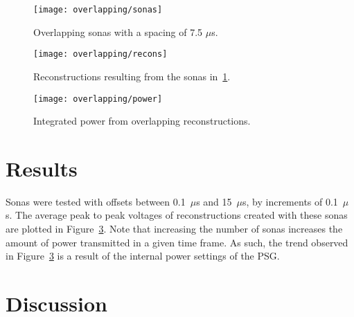 \begin{figure}[t]
\centering
\texttt{[image: overlapping/sonas]}
\caption[Overlapping sonas]{Overlapping sonas with a spacing of 7.5 $\mu$s.}
\label{fig:overlapping-sonas}
\end{figure}

\begin{figure}[t]
\centering
\texttt{[image: overlapping/recons]}
\caption[Overlapping reconstructions]{Reconstructions resulting from the sonas in~\ref{fig:overlapping-sonas}.}
\label{fig:overlapping-recons}
\end{figure}

\begin{figure}[t]
\centering
\texttt{[image: overlapping/power]}
\caption[Power from overlapping reconstructions]{Integrated power from overlapping reconstructions.}
\label{fig:overlapping-power}
\end{figure}

\section{Results}
\label{sec:overlapping-results}

Sonas were tested with offsets between 0.1~$\mu$s and 15~$\mu$s, by increments of 0.1~$\mu$s. The average peak to peak voltages of reconstructions created with these sonas are plotted in Figure~\ref{fig:overlapping-power}. Note that increasing the number of sonas increases the amount of power transmitted in a given time frame. As such, the trend observed in Figure~\ref{fig:overlapping-power} is a result of the internal power settings of the PSG.


\section{Discussion}
\label{sec:overlapping-discussion}

